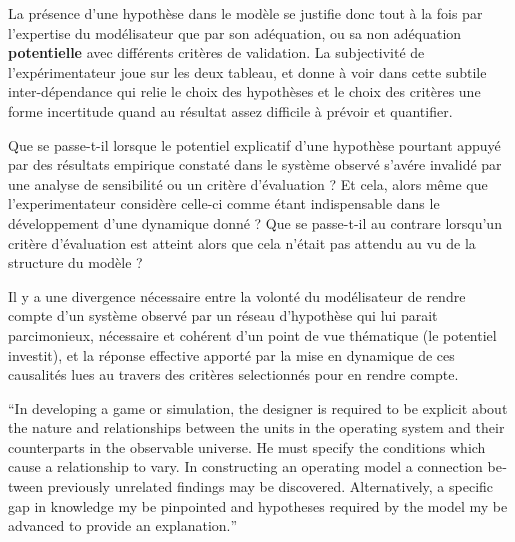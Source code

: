 La présence d'une hypothèse dans le modèle se justifie donc tout à la fois par l'expertise du modélisateur que par son adéquation, ou sa non adéquation \textbf{potentielle} avec différents critères de validation. La subjectivité de l'expérimentateur joue sur les deux tableau, et donne à voir dans cette subtile inter-dépendance qui relie le choix des hypothèses et le choix des critères une forme incertitude quand au résultat assez difficile à prévoir et quantifier.

Que se passe-t-il lorsque le potentiel explicatif d'une hypothèse pourtant appuyé par des résultats empirique constaté dans le système observé s'avére invalidé par une analyse de sensibilité ou un critère d'évaluation ? Et cela, alors même que l'experimentateur considère celle-ci comme étant indispensable dans le développement d'une dynamique donné ? Que se passe-t-il au contrare lorsqu'un critère d'évaluation est atteint alors que cela n'était pas attendu au vu de la structure du modèle ? 


Il y a une divergence nécessaire entre la volonté du modélisateur de rendre compte d'un système observé par un réseau d'hypothèse qui lui parait parcimonieux, nécessaire et cohérent d'un point de vue thématique (le potentiel investit), et la réponse effective apporté par la mise en dynamique de ces causalités lues au travers des critères selectionnés pour en rendre compte. %

\foreignquote{english}{In developing a game or simulation, the designer is required to be explicit about the nature and relationships between the units in the operating system and their counterparts in the observable universe. He must specify the conditions which cause a relationship to vary. In constructing an operating model a connection between previously unrelated findings may be discovered. Alternatively, a specific gap in knowledge my be pinpointed and hypotheses required by the model my be advanced to provide an explanation.} \autocite[219]{Hermann1967}


